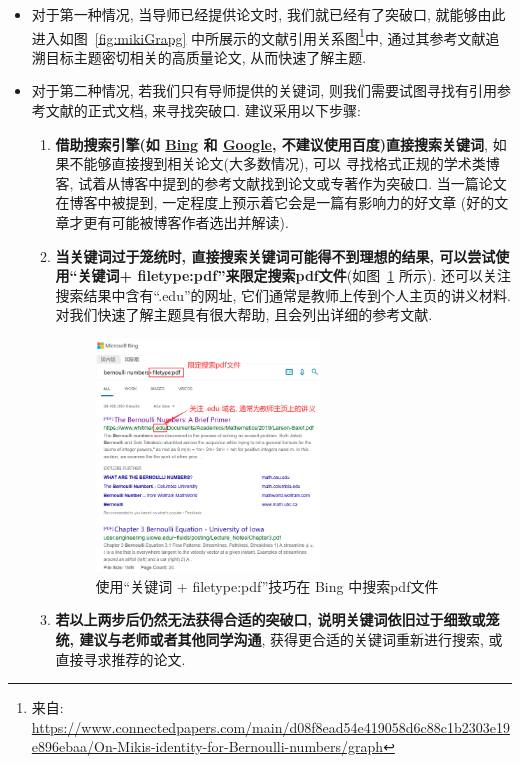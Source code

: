 \documentclass{booki}
\begin{document}
\begin{itemize}
    \item 对于第一种情况, 当导师已经提供论文时, 我们就已经有了突破口, 就能够由此进入如图~\ref{fig:mikiGrapg} 中所展示的文献引用关系图\footnote{来自: \url{https://www.connectedpapers.com/main/d08f8ead54e419058d6c88c1b2303e19e896ebaa/On-Mikis-identity-for-Bernoulli-numbers/graph}}中, 通过其参考文献追溯目标主题密切相关的高质量论文, 从而快速了解主题.
    \item 对于第二种情况, 若我们只有导师提供的关键词, 则我们需要试图寻找有引用参考文献的正式文档, 来寻找突破口. 建议采用以下步骤:
          \begin{enumerate}
              \item \textbf{借助搜索引擎(如 \href{https://www.bing.com/}{Bing} 和 \href{https://www.google.com/}{Google}, 不建议使用百度)直接搜索关键词}, 如果不能够直接搜到相关论文(大多数情况), 可以 寻找格式正规的学术类博客, 试着从博客中提到的参考文献找到论文或专著作为突破口. 当一篇论文在博客中被提到, 一定程度上预示着它会是一篇有影响力的好文章 (好的文章才更有可能被博客作者选出并解读).
              \item \textbf{当关键词过于笼统时, 直接搜索关键词可能得不到理想的结果, 可以尝试使用``关键词+ filetype:pdf''来限定搜索pdf文件}(如图~\ref{fig:bing} 所示). 还可以关注搜索结果中含有``.edu''的网址, 它们通常是教师上传到个人主页的讲义材料. 对我们快速了解主题具有很大帮助, 且会列出详细的参考文献.
              \begin{figure}[H]
    \centering
    \includegraphics[width=0.6\textwidth]{figure/bingSearch.png}
    \caption{使用``关键词 + filetype:pdf''技巧在 Bing 中搜索pdf文件}
    \label{fig:bing}
\end{figure}
              \item \textbf{若以上两步后仍然无法获得合适的突破口, 说明关键词依旧过于细致或笼统, 建议与老师或者其他同学沟通}, 获得更合适的关键词重新进行搜索, 或直接寻求推荐的论文.
          \end{enumerate}
\end{itemize}
\end{document}
